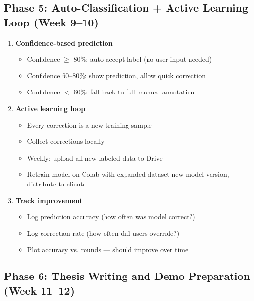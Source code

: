 \documentclass[11pt,a4paper]{article}
\begin{document}
\subsection{Phase 5: Auto-Classification + Active Learning Loop (Week 9--10)}

\begin{enumerate}[leftmargin=*,noitemsep]
    \item \textbf{Confidence-based prediction}
    \begin{itemize}[leftmargin=*,noitemsep]
        \item Confidence $\geq$ 80\%: auto-accept label (no user input needed)
        \item Confidence 60--80\%: show prediction, allow quick correction
        \item Confidence $<$ 60\%: fall back to full manual annotation
    \end{itemize}
    
    \item \textbf{Active learning loop}
    \begin{itemize}[leftmargin=*,noitemsep]
        \item Every correction is a new training sample
        \item Collect corrections locally
        \item Weekly: upload all new labeled data to Drive
        \item Retrain model on Colab with expanded dataset
        \export new model version, distribute to clients
    \end{itemize}
    
    \item \textbf{Track improvement}
    \begin{itemize}[leftmargin=*,noitemsep]
        \item Log prediction accuracy (how often was model correct?)
        \item Log correction rate (how often did users override?)
        \item Plot accuracy vs. rounds — should improve over time
    \end{itemize}
\end{enumerate}

\subsection{Phase 6: Thesis Writing and Demo Preparation (Week 11--12)}
\end{document}
